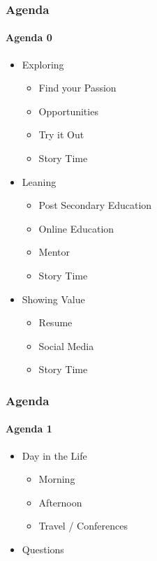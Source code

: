 \documentclass[aspectratio=169]{beamer}
\begin{document}
\begin{frame}
  \frametitle{Agenda}
  \framesubtitle{Agenda 0}
  \begin{itemize}
    \item{Exploring}
      \begin{itemize}
        \item{Find your Passion}
        \item{Opportunities}
        \item{Try it Out}
        \item{Story Time}
      \end{itemize}
    \item{Leaning}
      \begin{itemize}
      \item{Post Secondary Education}
      \item{Online Education}
      \item{Mentor}
      \item{Story Time}
      \end{itemize}
    \item{Showing Value}
      \begin{itemize}
        \item{Resume}
        \item{Social Media}
        \item{Story Time}
      \end{itemize}
  \end{itemize}
\end{frame}

\begin{frame}
  \frametitle{Agenda}
  \framesubtitle{Agenda 1}
  \begin{itemize}
  \item{Day in the Life}
    \begin{itemize}
    \item{Morning}
    \item{Afternoon}
    \item{Travel / Conferences}
    \end{itemize}
  \item{Questions}
  \end{itemize}
\end{frame}
\end{document}
